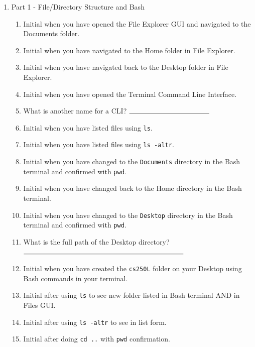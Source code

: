 \documentclass[notitlepage,12pt]{../../cpsc250l}
\begin{document}
\begin{enumerate}
\item Part 1 - File/Directory Structure and Bash
	\begin{enumerate}
	\item \initial Initial when you have opened the File Explorer GUI and navigated to the Documents folder.
	\item \initial Initial when you have navigated to the Home folder in File Explorer.
	\item \initial Initial when you have navigated back to the Desktop folder in File Explorer.
	\item \initial Initial when you have opened the Terminal Command Line Interface.
	\item What is another name for a CLI?  $\rule{4cm}{0.15mm}$
	\item \initial Initial when you have listed files using \texttt{ls}.
	\item \initial Initial when you have listed files using \texttt{ls -altr}.
	\item \initial Initial when you have changed to the \texttt{Documents} directory in the Bash terminal and confirmed with \texttt{pwd}.
	\item \initial Initial when you have changed back to the Home directory in the Bash terminal.
	\item \initial Initial when you have changed to the \texttt{Desktop} directory in the Bash terminal and confirmed with \texttt{pwd}.
	\item What is the full path of the Desktop directory?\\ $\rule{8cm}{0.15mm}$
	\item \initial Initial when you have created the \texttt{cs250L} folder on your Desktop using Bash commands in your terminal.
	\item \initial Initial after using \texttt{ls} to see new folder listed in Bash terminal AND in Files GUI.
	\item \initial Initial after using \texttt{ls -altr} to see in list form.
	\item \initial Initial after doing \texttt{cd ..} with \texttt{pwd} confirmation.


\end{enumerate}
\end{enumerate}
\end{document}
